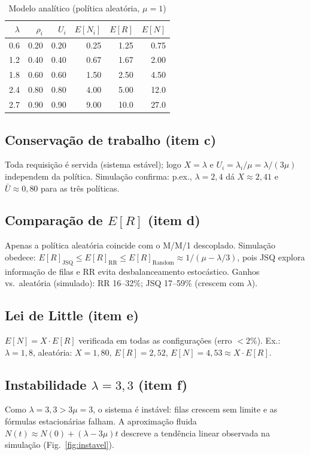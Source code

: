 \documentclass[conference]{IEEEtran}
\begin{document}
\begin{table}[!t]
\centering
\caption{Modelo analítico (política aleatória, $\mu=1$)}
\label{tab:analitico}
\scriptsize
\begin{tabular}{@{}rrrrrr@{}}
\toprule
$\lambda$ & $\rho_i$ & $U_i$ & $E[N_i]$ & $E[R]$ & $E[N]$ \\
\midrule
0.6 & 0.20 & 0.20 & 0.25 & 1.25 & 0.75 \\
1.2 & 0.40 & 0.40 & 0.67 & 1.67 & 2.00 \\
1.8 & 0.60 & 0.60 & 1.50 & 2.50 & 4.50 \\
2.4 & 0.80 & 0.80 & 4.00 & 5.00 & 12.0 \\
2.7 & 0.90 & 0.90 & 9.00 & 10.0 & 27.0 \\
\bottomrule
\end{tabular}
\end{table}

\subsection{Conservação de trabalho (item c)}
Toda requisição é servida (sistema estável); logo $X=\lambda$ e $U_i=\lambda_i/\mu=\lambda/(3\mu)$ independem da política. Simulação confirma: p.ex., $\lambda=2{,}4$ dá $X \approx 2{,}41$ e $\bar{U}\approx 0{,}80$ para as três políticas.

\subsection{Comparação de $E[R]$ (item d)}
Apenas a política aleatória coincide com o M/M/1 descoplado. Simulação obedece:
$E[R]_{\text{JSQ}} \le E[R]_{\text{RR}} \le E[R]_{\text{Random}} \approx 1/(\mu-\lambda/3)$,
pois JSQ explora informação de filas e RR evita desbalanceamento estocástico. Ganhos vs.\ aleatória (simulado): RR 16--32\%; JSQ 17--59\% (crescem com $\lambda$).

\subsection{Lei de Little (item e)}
$E[N]=X\cdot E[R]$ verificada em todas as configurações (erro $<2\%$). Ex.: $\lambda=1{,}8$, aleatória: $X=1{,}80$, $E[R]=2{,}52$, $E[N]=4{,}53 \approx X\!\cdot\!E[R]$.

\subsection{Instabilidade $\lambda=3{,}3$ (item f)}
Como $\lambda=3{,}3 > 3\mu=3$, o sistema é instável: filas crescem sem limite e as fórmulas estacionárias falham. A aproximação fluida $N(t)\approx N(0)+(\lambda-3\mu)t$ descreve a tendência linear observada na simulação (Fig.~\ref{fig:instavel}).
\end{document}
